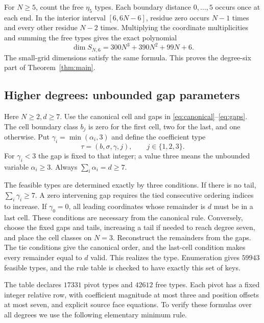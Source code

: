 \documentclass[11pt]{article}
\theoremstyle{remark}
\begin{document}
For $N\ge5$, count the free $\eta_5$ types. Each boundary distance
$0,\ldots,5$ occurs once at each end. In the interior interval
$[6,6N-6]$, residue zero occurs $N-1$ times and every other residue
$N-2$ times. Multiplying the coordinate multiplicities and summing the
free types gives the exact polynomial
\begin{equation}\label{eq:six-dimension}
 \dim S_{N,6}=300N^3+390N^2+99N+6.
\end{equation}
The small-grid dimensions satisfy the same formula. This proves the
degree-six part of Theorem~\ref{thm:main}.

\subsection{Higher degrees: unbounded gap parameters}

Here $N\ge2,d\ge7$. Use the canonical cell and gaps in
\eqref{eq:canonical}--\eqref{eq:gaps}. The cell boundary class $b_j$ is
zero for the first cell, two for the last, and one otherwise. Put
$\gamma_i=\min(\alpha_i,3)$ and define the coefficient type
\begin{equation}\label{eq:type}
 \tau=(b,\sigma,\gamma,j),\qquad j\in\{1,2,3\}.
\end{equation}
For $\gamma_i<3$ the gap is fixed to that integer; a value three means
the unbounded variable $\alpha_i\ge3$. Always $\sum_i\alpha_i=d\ge7$.

The feasible types are determined exactly by three conditions. If there
is no tail, $\sum_i\gamma_i\ge7$. A zero intervening gap requires the
tied consecutive ordering indices to increase. If $\gamma_0=0$, all
leading coordinates whose remainder is $d$ must be in a last cell.
These conditions are necessary from the canonical rule. Conversely,
choose the fixed gaps and tails, increasing a tail if needed to reach
degree seven, and place the cell classes on $N=3$. Reconstruct the
remainders from the gaps. The tie conditions give the canonical order,
and the last-cell condition makes every remainder equal to $d$ valid.
This realizes the type. Enumeration gives $59943$ feasible types, and
the rule table is checked to have exactly this set of keys.

The table declares $17331$ pivot types and $42612$ free types. Each pivot
has a fixed integer relative row, with coefficient magnitude at most three
and position offsets at most seven, and explicit source face equations.
To verify these formulas over all degrees we use the following elementary
minimum rule.
\end{document}
